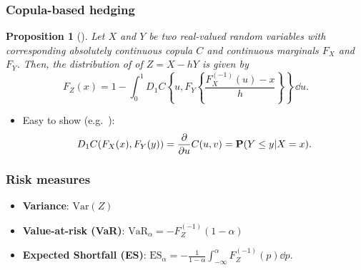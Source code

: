 \documentclass[10pt,mathserif]{beamer}
\renewcommand{\(}{\begin{columns}}
\renewcommand{\)}{\end{columns}}
\newcommand{\<}[1]{\begin{column}{#1}}
\renewcommand{\>}{\end{column}}
\newtheorem{proposition}[theorem]{Proposition}
\theoremstyle{definition}
\begin{document}


\begin{frame}
  \frametitle{Copula-based hedging}
  \begin{proposition}[\cite{Barbi2014}]
  \label{prop:dfrh}
  Let $X$ and $Y$ be two real-valued random variables with
  corresponding 
  absolutely continuous copula $C$ and
  continuous marginals $F_X$ and $F_Y$. Then, the distribution
  of of $Z=X - h Y$ is given by
  \begin{equation}
    \label{eq:3}
    F_Z(x) = 1- \int^1_0 D_1 C
    \left\{ u, F_Y \left\{ \frac{F^{(-1)}_X(u)-x}{h} \right\}
    \right\}\, \dd u.
  \end{equation}
\end{proposition}
\begin{itemize}
\item Easy to show (e.g.\ \citet{McNeil2005}):
\begin{equation*}
  D_1 C(F_X(x), F_Y(y)) = \frac{\partial}{\partial u} C(u,v) = {\bf P}(Y\leq y|X=x).
\end{equation*}
\end{itemize}
\end{frame}

\begin{frame}
  \frametitle{Risk measures}
  \begin{itemize}
    \addtolength{\itemsep}{8pt}
  \item {\bf Variance}: $\text{Var}(Z)$
  \item {\bf Value-at-risk (VaR)}: $\text{VaR}_\alpha = -
    F_Z^{(-1)}(1-\alpha)$  
  \item {\bf Expected Shortfall (ES)}: 
    $\displaystyle \text{ES}_\alpha =-
    \frac{1}{1-\alpha}\int_{-\infty}^{\alpha} F_Z^{(-1)}(p) \dd p$.
  \end{itemize}
\end{frame}
\end{document}
